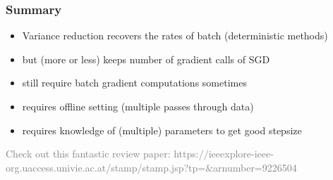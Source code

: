 \documentclass[aspectratio=149]{beamer}
\begin{document}
\begin{frame}
  \frametitle{Summary}

  \begin{itemize}
    \item Variance reduction recovers the rates of batch (deterministic methods)
    \item but (more or less) keeps number of gradient calls of SGD
    \item still require batch gradient computations sometimes
    \item requires offline setting (multiple passes through data)
    \item requires knowledge of (multiple) parameters to get good stepsize
  \end{itemize}

  \textcolor{gray}{
  Check out this fantastic review paper:
  https://ieeexplore-ieee-org.uaccess.univie.ac.at/stamp/stamp.jsp?tp=&arnumber=9226504}

\end{frame}
\end{document}
